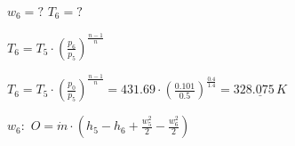 \( w_6 = ? \)  
\( T_6 = ? \)  

\( T_6 = T_5 \cdot \left( \frac{p_6}{p_5} \right)^{\frac{n-1}{n}} \)  

\( T_6 = T_5 \cdot \left( \frac{p_0}{p_5} \right)^{\frac{n-1}{n}} = 431.69 \cdot \left( \frac{0.101}{0.5} \right)^{\frac{0.4}{1.4}} = \underline{328.075 \, K} \)  

\( w_6: \)  
\( O = \dot{m} \cdot \left( h_5 - h_6 + \frac{w_5^2}{2} - \frac{w_6^2}{2} \right) \)